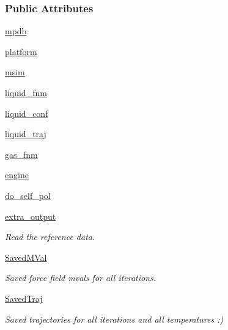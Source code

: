 \subsubsection*{Public Attributes}
\begin{DoxyCompactItemize}
\item 
\hyperlink{classforcebalance_1_1openmmio_1_1Liquid__OpenMM_aaaa8d66c5bb45d847e1fbcd3953fe0d3}{mpdb}
\item 
\hyperlink{classforcebalance_1_1openmmio_1_1Liquid__OpenMM_ab9cc3ba5e2cb545e714733efe99c00e1}{platform}
\item 
\hyperlink{classforcebalance_1_1openmmio_1_1Liquid__OpenMM_acf60da4350bb882795a8143b1b85ca57}{msim}
\item 
\hyperlink{classforcebalance_1_1openmmio_1_1Liquid__OpenMM_a688bca0f29a2d62deb7fad0a488a7a14}{liquid\-\_\-fnm}
\item 
\hyperlink{classforcebalance_1_1openmmio_1_1Liquid__OpenMM_ad7ba892bf3ec0f986f17ec12e478e977}{liquid\-\_\-conf}
\item 
\hyperlink{classforcebalance_1_1openmmio_1_1Liquid__OpenMM_a113b333fdca5faedc03600d204c3a49b}{liquid\-\_\-traj}
\item 
\hyperlink{classforcebalance_1_1openmmio_1_1Liquid__OpenMM_a7b835f5dbacf1c31ead8c0c47e6895ce}{gas\-\_\-fnm}
\item 
\hyperlink{classforcebalance_1_1openmmio_1_1Liquid__OpenMM_ac46cb2eaf7e4fcbe92d24d213b017d57}{engine}
\item 
\hyperlink{classforcebalance_1_1liquid_1_1Liquid_a2cf65dd56f058636e68a0b3bf2af210e}{do\-\_\-self\-\_\-pol}
\item 
\hyperlink{classforcebalance_1_1liquid_1_1Liquid_a646aeaaff46cf6a8e97f5cd5016a222f}{extra\-\_\-output}
\begin{DoxyCompactList}\small\item\em Read the reference data. \end{DoxyCompactList}\item 
\hyperlink{classforcebalance_1_1liquid_1_1Liquid_a5b9df1bf79a641156429e292f47b6afd}{Saved\-M\-Val}
\begin{DoxyCompactList}\small\item\em Saved force field mvals for all iterations. \end{DoxyCompactList}\item 
\hyperlink{classforcebalance_1_1liquid_1_1Liquid_a0da0c00cdc193c9c470d7e528043fb99}{Saved\-Traj}
\begin{DoxyCompactList}\small\item\em Saved trajectories for all iterations and all temperatures \-:) \end{DoxyCompactList}\item 

\end{DoxyCompactItemize}
